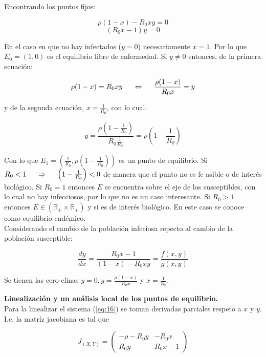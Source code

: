 \documentclass[10pt,oneside]{article}
\begin{document}
\begin{multicols}{2}
    Encontrando los puntos fijos:

    $$\rho(1-x)-R_0xy=0$$
    $$(R_0x-1)y=0$$

    En el caso en que no hay infectados ($y=0$) necesariamente $x=1$. Por lo que $E_0=(1,0)$ es el equilibrio libre de enfermedad. Si $y\neq 0$ entonces, de la primera ecuación: 

    $$\rho(1-x)=R_0xy\hspace{0.5cm}\Leftrightarrow\hspace{0.5cm}\frac{\rho(1-x)}{R_0x}=y$$

    y de la segunda ecuación, $x=\displaystyle{\frac{1}{R_0}}$, con lo cual:

    $$y=\frac{\rho\left(1-\frac{1}{R_0}\right)}{R_0\frac{1}{R_0}}=\rho\left(1-\frac{1}{R_0}\right)$$

    Con lo que $\displaystyle{E_1=\left(\frac{1}{R_0}, \rho\left(1-\frac{1}{R_0}\right)\right)}$ es un punto de equilibrio. Si $R_0<1\hspace{0.5cm}\Rightarrow\hspace{0.5cm}\left(1-\frac{1}{R_0}\right)<0$ de manera que el punto no es fe asible o de interés biológico. Si $R_0=1$ entonces $E$ se encuentra sobre el eje de los susceptibles, con lo cual no hay infecciosos, por lo que no es un caso interesante. Si $R_0>1$ entonces $E \in (\mathbb{R_+}\times\mathbb{R_+})$ y si es de interés biológico. En este caso se conoce como equilibrio endémico.\\ \newline
    Considerando el cambio de la población infeciosa repecto al cambio de la población susceptible:

    $$\frac{dy}{dx}=\frac{R_0x-1}{(1-x)-R_0xy}=\frac{f(x,y)}{g(x,y)}$$

    Se tienen las cero-clinas $y=0, \displaystyle{y=\frac{\rho(1-x)}{R_0x}}$ y $\displaystyle{x=\frac{1}{R_0}}$. \\\newline

    \textbf{Linealización y un análisis local de los puntos de equilibrio.}\\ \newline Para la  linealizar el sistema (\ref{eq:16}) se toman derivadas parciales respeto a $x $ y $y$. I.e. la matríz jacobiana es tal que 

    $$J_{(X,Y)}=\left(\begin{array}{cc}
       -\rho-R_0y  & -R_0x \\
       R_0y  & R_0x-1
    \end{array}\right)$$


\end{multicols}
\end{document}
